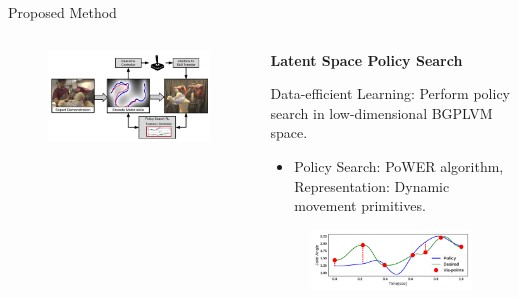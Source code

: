 \documentclass[final,hyperref={pdfpagelabels=false}]{beamer}
\begin{document}
\begin{frame}[t]
\begin{columns}[t]
\begin{column}{0.96\linewidth}
\begin{alertblock}{Proposed Method}
\begin{columns}[t]
\begin{column}{0.4\textwidth}
                        \begin{figure}
                            \centering
                            \includegraphics[width=\textwidth]{overview}
                        \end{figure}
                    \end{column}

                    \begin{column}{0.3\textwidth}
                        \centering \textbf{Latent Space Policy Search}

                        \centering Data-efficient Learning: Perform policy search in low-dimensional BGPLVM space. 

                        \begin{itemize}
                            \item Policy Search: PoWER algorithm, Representation: Dynamic movement primitives.
                        \end{itemize}

                        \begin{figure}
                            \centering
                            \includegraphics[width=\textwidth]{rewards}
                        \end{figure}


\end{column}
\end{columns}
\end{alertblock}
\end{column}
\end{columns}
\end{frame}
\end{document}
